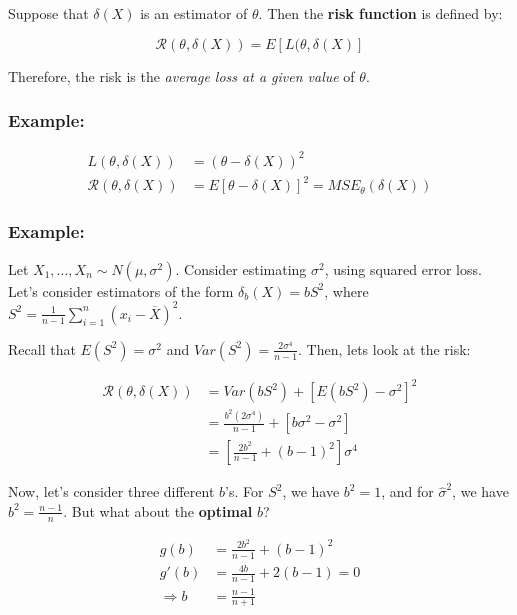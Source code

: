 \documentclass{article}
\begin{document}
Suppose that $\delta (X)$ is an estimator of $\theta$. Then the \textbf{risk function} is defined by:

\begin{equation*}
    \mathcal{R}(\theta,\delta (X)) = E\left[L(\theta,\delta(X) \right]
\end{equation*}

Therefore, the risk is the \textit{average loss at a given value} of $\theta$.

\subsubsection*{Example:}
\begin{equation*}
    \begin{split}
        L(\theta,\delta (X)) &= (\theta - \delta (X))^2\\
        \mathcal{R}(\theta,\delta(X)) &= E[\theta-\delta(X)]^2 = MSE_\theta (\delta(X))
    \end{split}
\end{equation*}

\subsubsection*{Example:}

Let $X_1,...,X_n\sim N(\mu,\sigma^2)$. Consider estimating $\sigma^2$, using squared error loss. Let's consider estimators of the form $\delta_b(X) = bS^2$, where $S^2 = \frac{1}{n-1}\sum_{i=1}^n(x_i-\overline{X})^2$.

Recall that $E(S^2) = \sigma^2$ and $Var(S^2) = \frac{2\sigma^4}{n-1}$. Then, lets look at the risk:

\begin{equation*}
\begin{split}
    \mathcal{R}(\theta,\delta(X)) &= Var(bS^2) + \left[E(bS^2) - \sigma^2 \right]^2\\
    &= \frac{b^2(2\sigma^4)}{n-1} + [b\sigma^2 - \sigma^2]\\
    &= \left[\frac{2b^2}{n-1} + (b-1)^2 \right] \sigma^4
\end{split}
\end{equation*}

Now, let's consider three different $b$'s. For $S^2$, we have $b^2 = 1$, and for $\hat{\sigma}^2$, we have $b^2 = \frac{n-1}{n}$. But what about the \textbf{optimal} $b$? 

\begin{equation*}
    \begin{split}
        g(b) &= \frac{2b^2}{n-1} + (b-1)^2\\
        g'(b) &= \frac{4b}{n-1} + 2(b-1) = 0\\
        \Rightarrow b &= \frac{n-1}{n+1}
    \end{split}
\end{equation*}
\end{document}
